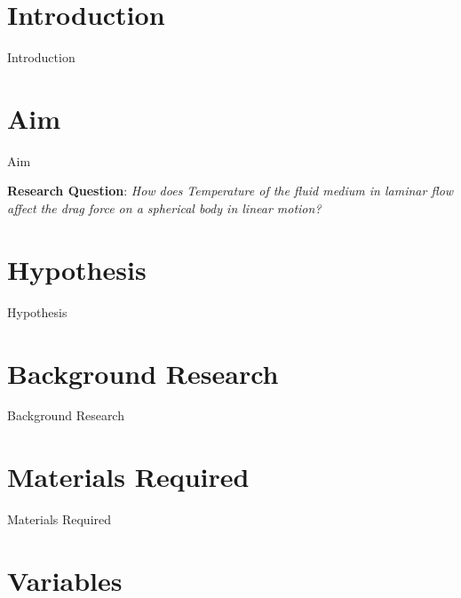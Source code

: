\documentclass[12pt, a4paper]{article}
\begin{document}
\maketitle

\tableofcontents
\clearpage



\begin{abstract}
    {Abstract}
\end{abstract}



\section{{Introduction}}
        
        {Introduction}       
        
\section{{Aim}}
        
        {Aim}

			
\large
			
		{\textbf{Research Question}: \textit{How does Temperature of the fluid medium in laminar flow affect the drag force on a spherical body in linear motion?} }
			
\normalsize
				
\section{{Hypothesis}}
        
        {Hypothesis}    
        
\section{{Background Research}}
        
        {Background Research}
        
\section{{Materials Required}}
        
        {Materials Required}
        
\section{{Variables}}
        
\end{document}
